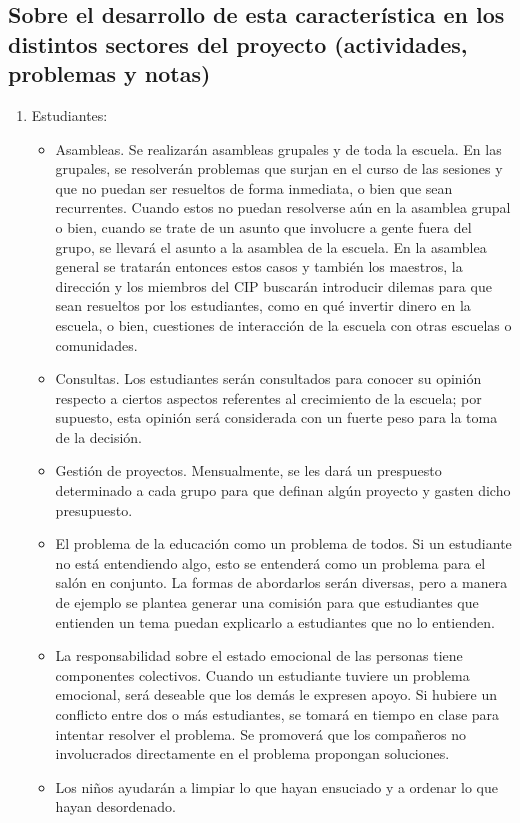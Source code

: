 \documentclass[10pt,letterpaper,oneside]{book}
\begin{document}
		\subsection*{Sobre el desarrollo de esta característica en los distintos sectores del proyecto (actividades, problemas y notas)}
			\begin{enumerate}[label=\Alph*]
			\item Estudiantes: 
		\begin{itemize}
		\item Asambleas. Se realizarán asambleas grupales y de toda la escuela. En las grupales, se resolverán problemas que surjan en el curso de las sesiones y que no puedan ser resueltos de forma inmediata, o bien que sean recurrentes. Cuando estos no puedan resolverse aún en la asamblea grupal o bien, cuando se trate de un asunto que involucre a gente fuera del grupo, se llevará el asunto a la asamblea de la escuela. En la asamblea general se tratarán entonces estos casos y también los maestros, la dirección y los miembros del CIP buscarán introducir dilemas para que sean resueltos por los estudiantes, como en qué invertir dinero en la escuela, o bien, cuestiones de interacción de la escuela con otras escuelas o comunidades.
		\item Consultas. Los estudiantes serán consultados para conocer su opinión respecto a ciertos aspectos referentes al crecimiento de la escuela; por supuesto, esta opinión será considerada con un fuerte peso para la toma de la decisión.
		\item Gestión de proyectos. Mensualmente, se les dará un prespuesto determinado a cada grupo para que definan algún proyecto y gasten dicho presupuesto.
		\item El problema de la educación como un problema de todos. Si un estudiante no está entendiendo algo, esto se entenderá como un problema para el salón en conjunto. La formas de abordarlos serán diversas, pero a manera de ejemplo se plantea generar una comisión para que estudiantes que entienden un tema puedan explicarlo a estudiantes que no lo entienden.
		\item La responsabilidad sobre el estado emocional de las personas tiene componentes colectivos. Cuando un estudiante tuviere un problema emocional, será deseable que los demás le expresen apoyo. Si hubiere un conflicto entre dos o más estudiantes, se tomará en tiempo en clase para intentar resolver el problema. Se promoverá que los compañeros no involucrados directamente en el problema propongan soluciones.
		\item Los niños ayudarán a limpiar lo que hayan ensuciado y a ordenar lo que hayan desordenado.
\end{itemize}					


\end{enumerate}
\end{document}
